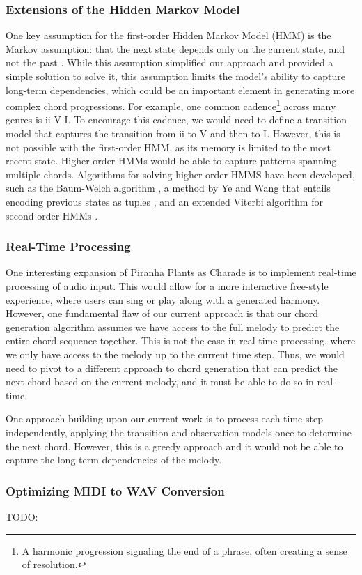 \subsubsection{Extensions of the Hidden Markov Model}

One key assumption for the first-order Hidden Markov Model (HMM) is the Markov assumption: that the next state depends only on the current state, and not the past \autocite{SpeechLang:2025}. While this assumption simplified our approach and provided a simple solution to solve it, this assumption limits the model's ability to capture long-term dependencies, which could be an important element in generating more complex chord progressions. For example, one common cadence\footnote{A harmonic progression signaling the end of a phrase, often creating a sense of resolution.} across many genres is ii-V-I. To encourage this cadence, we would need to define a transition model that captures the transition from ii to V and then to I. However, this is not possible with the first-order HMM, as its memory is limited to the most recent state. Higher-order HMMs would be able to capture patterns spanning multiple chords. Algorithms for solving higher-order HMMS have been developed, such as the Baum-Welch algorithm \autocite{BaumWelch:1970}, a method by Ye and Wang that entails encoding previous states as tuples \autocite{DecodeHMM:2014}, and an extended Viterbi algorithm for second-order HMMs \autocite{Viterbi2:1988}.

\subsubsection{Real-Time Processing}

One interesting expansion of Piranha Plants as Charade is to implement real-time processing of audio input. This would allow for a more interactive free-style experience, where users can sing or play along with a generated harmony. However, one fundamental flaw of our current approach is that our chord generation algorithm assumes we have access to the full melody to predict the entire chord sequence together. This is not the case in real-time processing, where we only have access to the melody up to the current time step. Thus, we would need to pivot to a different approach to chord generation that can predict the next chord based on the current melody, and it must be able to do so in real-time.

One approach building upon our current work is to process each time step independently, applying the transition and observation models once to determine the next chord. However, this is a greedy approach and it would not be able to capture the long-term dependencies of the melody.

\subsubsection{Optimizing MIDI to WAV Conversion}

TODO:
